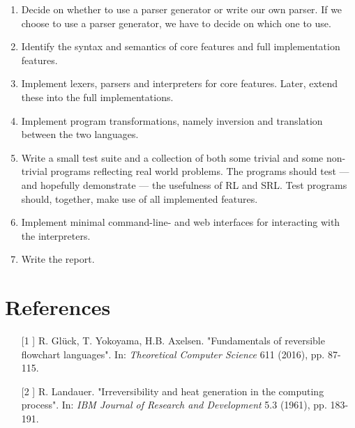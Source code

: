 \begin{enumerate}

  \item Decide on whether to use a parser generator or write our own parser. If we choose to use a parser generator, we have to decide on which one to use.

  \item Identify the syntax and semantics of core features and full implementation features.

  \item Implement lexers, parsers and interpreters for core features. Later, extend these into the full implementations.

  \item Implement program transformations, namely inversion and translation between the two languages.

  \item Write a small test suite and a collection of both some trivial and some non-trivial programs reflecting real world problems. The programs should test --- and hopefully demonstrate --- the usefulness of RL and SRL. Test programs should, together, make use of all implemented features.

  \item Implement minimal command-line- and web interfaces for interacting with the interpreters.

  \item Write the report.

\end{enumerate}


\appendix
\section{References}

\begin{enumerate}
  \item[[1]] R. Glück, T. Yokoyama, H.B. Axelsen. "Fundamentals of reversible flowchart languages". In: \textit{Theoretical Computer Science} 611 (2016), pp. 87-115.
  \item[[2]] R. Landauer. "Irreversibility and heat generation in the computing process". In: \textit{IBM Journal of Research and Development} 5.3 (1961), pp. 183-191.
\end{enumerate}
